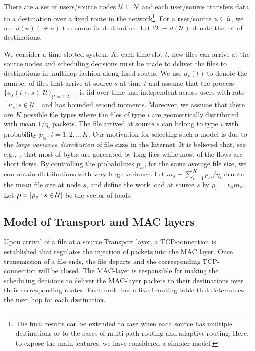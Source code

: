 \documentclass[10pt,onecolumn,draftclsnofoot,journal]{IEEEtran}
\newcommand{\brho}{\mbox{\boldmath$\rho$}}
\begin{document}
There are a set of users/source nodes $\mathcal{U} \subseteq \mathcal{N}$ and each user/source transfers data to a destination over a fixed route in the network\footnote{The final results can be extended to case when each source has multiple destinations or to the cases of multi-path routing and adaptive routing. Here, to expose the main features, we have considered a simpler model.}. For a user/source $u \in \mathcal{U}$, we use $d(u) (\neq u)$ to denote its destination. Let $\mathcal{D}:=d(\mathcal{U})$ denote the set of destinations.

We consider a time-slotted system. At each time slot $t$,
new files can arrive at the source nodes and scheduling decisions must be made to deliver the files to destinations in multihop fashion along fixed routes.
We use $a_s(t)$ to denote the number of files that arrive at source $s$ at time $t$ and assume that the process $\{a_s(t); s \in \mathcal{U}\}_{\{t=1,2, \cdots \}}$ is iid over time and independent across users with rate $[\kappa_s; s \in \mathcal{U}]$ and has bounded second moments.
Moreover, we assume that there are $K$ possible file types where the files of type $i$ are geometrically distributed with mean $1/\eta_i$ packets. The file arrived at source $s$ can belong to type $i$ with probability $p_{si}$, $i=1,2,..,K$. Our motivation for selecting such a model is due to the \textit{large variance distribution} of file sizes in the Internet. It is believed that, see e.g.,~\cite{self}, that most of bytes are generated by long files while most of the flows are short flows. By controlling the probabilities $p_{si}$, for the same average file size, we can obtain distributions with very large variance.
Let $m_s=\sum_{i=1}^K{p_{si}/\eta_i}$ denote the mean file size at node $s$, and define the work load at source $s$ by $\rho_s=\kappa_s m_s$. Let $\brho=[\rho_s: s \in \mathcal{U}]$ be the vector of loads.
\subsection*{Model of Transport and MAC layers}
Upon arrival of a file at a source Transport layer, a TCP-connection is
established that regulates the injection of packets into the
MAC layer. Once transmission of
a file ends, the file departs and the corresponding TCP-connection
will be closed. The MAC-layer is responsible for making the scheduling decisions to deliver the MAC-layer packets to their destinations over their corresponding routes. Each node has a fixed routing table that determines the next hop for each destination.
\end{document}
